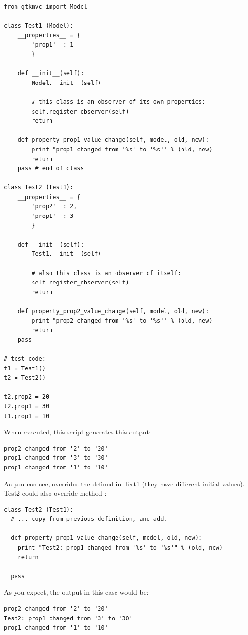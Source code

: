 { \codesize
\begin{verbatim} 
from gtkmvc import Model

class Test1 (Model):
    __properties__ = {
        'prop1'  : 1
        }

    def __init__(self):
        Model.__init__(self)

        # this class is an observer of its own properties:
        self.register_observer(self) 
        return
    
    def property_prop1_value_change(self, model, old, new):
        print "prop1 changed from '%s' to '%s'" % (old, new)
        return
    pass # end of class

class Test2 (Test1):    
    __properties__ = {
        'prop2'  : 2,
        'prop1'  : 3
        }
    
    def __init__(self):
        Test1.__init__(self)
        
        # also this class is an observer of itself:
        self.register_observer(self)
        return
    
    def property_prop2_value_change(self, model, old, new):
        print "prop2 changed from '%s' to '%s'" % (old, new)
        return
    pass

# test code:
t1 = Test1()
t2 = Test2()

t2.prop2 = 20
t2.prop1 = 30
t1.prop1 = 10
\end{verbatim}
}

When executed, this script generates this output:
{ \codesize 
\begin{verbatim} 
prop2 changed from '2' to '20'
prop1 changed from '3' to '30'
prop1 changed from '1' to '10'
\end{verbatim}
}

As you can see,  overrides the \OP {}
defined in Test1 (they have different initial values).  Test2 could
also override method :

{ \codesize 
\begin{verbatim} 
class Test2 (Test1):
  # ... copy from previous definition, and add:
   
  def property_prop1_value_change(self, model, old, new):
    print "Test2: prop1 changed from '%s' to '%s'" % (old, new)
    return   

  pass
\end{verbatim}
}

As you expect, the output in this case would be:
{ \codesize 
\begin{verbatim} 
prop2 changed from '2' to '20'
Test2: prop1 changed from '3' to '30'
prop1 changed from '1' to '10'
\end{verbatim}
}


